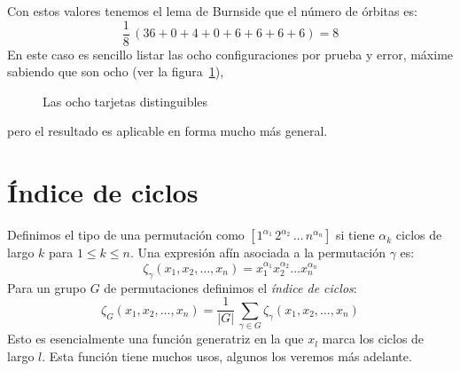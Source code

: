   Con estos valores tenemos el lema de Burnside
  que el número de órbitas es:
  \begin{equation*}
    \frac{1}{8} \, (36 + 0 + 4 + 0 + 6 + 6 + 6 + 6) = 8
  \end{equation*}
  En este caso es sencillo
  listar las ocho configuraciones por prueba y error,
  máxime sabiendo que son ocho
  (ver la figura~\ref{fig:tarjetas-distinguibles}),
  \begin{figure}[htbp]
    \centering
    \hspace{2em}%
    \centering
    \hspace{2em}%

    \hspace{2em}%

    \hspace{2em}%
    \hspace{2em}%
    \caption{Las ocho tarjetas distinguibles}
    \label{fig:tarjetas-distinguibles}
  \end{figure}
  pero el resultado es aplicable en forma mucho más general.

\section{Índice de ciclos}
\label{sec:indice-ciclos}

  Definimos el tipo de una permutación%
  como
    \(\left[ 1^{\alpha_1} \, 2^{\alpha_2}
	\, \dotso \, n^{\alpha_n} \right]\)
  si tiene \(\alpha_k\) ciclos de largo \(k\)
  para \(1 \le k \le n\).
  Una expresión afín asociada a la permutación \(\gamma\) es:
  \begin{equation*}
    \zeta_\gamma (x_1, x_2, \dotsc, x_n)
      = x_1^{\alpha_1} x_2^{\alpha_2} \dotso x_n^{\alpha_n}
  \end{equation*}
  Para un grupo \(G\) de permutaciones
  definimos el \emph{índice de ciclos}:
  \begin{equation*}
    \zeta_G (x_1, x_2, \dotsc, x_n)
      = \frac{1}{\lvert G \rvert} \,
	  \sum_{\gamma \in G} \zeta_\gamma (x_1, x_2, \dotsc, x_n)
  \end{equation*}
  Esto es esencialmente una función generatriz%
  en la que \(x_l\) marca los ciclos de largo \(l\).
  Esta función tiene muchos usos,
  algunos los veremos más adelante.

